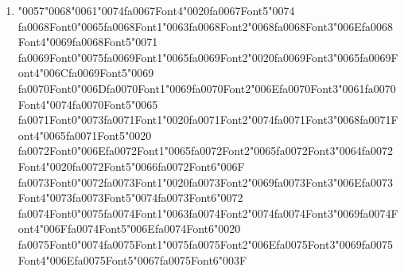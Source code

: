 \documentclass[12pt]{article}
\begin{document}
\begin{enumerate}[label=Q\arabic*.]
\begin{enumerate}[label=(\Alph*)]
    \item DPO trains directly on preference pairs without a separate reward model
    \item DPO requires a value network to compute advantages
    \item DPO prohibits using preference data
    \item DPO only optimizes next-word likelihood
\end{enumerate}
\item {\char"0057}{\char"0068}{\char"0061}{\char"0074}{\csname fa0067Font4\endcsname\char"0020}{\csname fa0067Font5\endcsname\char"0074} {\csname fa0068Font0\endcsname\char"0065}{\csname fa0068Font1\endcsname\char"0063}{\csname fa0068Font2\endcsname\char"0068}{\csname fa0068Font3\endcsname\char"006E}{\csname fa0068Font4\endcsname\char"0069}{\csname fa0068Font5\endcsname\char"0071} {\csname fa0069Font0\endcsname\char"0075}{\csname fa0069Font1\endcsname\char"0065}{\csname fa0069Font2\endcsname\char"0020}{\csname fa0069Font3\endcsname\char"0065}{\csname fa0069Font4\endcsname\char"006C}{\csname fa0069Font5\endcsname\char"0069} {\csname fa0070Font0\endcsname\char"006D}{\csname fa0070Font1\endcsname\char"0069}{\csname fa0070Font2\endcsname\char"006E}{\csname fa0070Font3\endcsname\char"0061}{\csname fa0070Font4\endcsname\char"0074}{\csname fa0070Font5\endcsname\char"0065} {\csname fa0071Font0\endcsname\char"0073}{\csname fa0071Font1\endcsname\char"0020}{\csname fa0071Font2\endcsname\char"0074}{\csname fa0071Font3\endcsname\char"0068}{\csname fa0071Font4\endcsname\char"0065}{\csname fa0071Font5\endcsname\char"0020} {\csname fa0072Font0\endcsname\char"006E}{\csname fa0072Font1\endcsname\char"0065}{\csname fa0072Font2\endcsname\char"0065}{\csname fa0072Font3\endcsname\char"0064}{\csname fa0072Font4\endcsname\char"0020}{\csname fa0072Font5\endcsname\char"0066}{\csname fa0072Font6\endcsname\char"006F} {\csname fa0073Font0\endcsname\char"0072}{\csname fa0073Font1\endcsname\char"0020}{\csname fa0073Font2\endcsname\char"0069}{\csname fa0073Font3\endcsname\char"006E}{\csname fa0073Font4\endcsname\char"0073}{\csname fa0073Font5\endcsname\char"0074}{\csname fa0073Font6\endcsname\char"0072} {\csname fa0074Font0\endcsname\char"0075}{\csname fa0074Font1\endcsname\char"0063}{\csname fa0074Font2\endcsname\char"0074}{\csname fa0074Font3\endcsname\char"0069}{\csname fa0074Font4\endcsname\char"006F}{\csname fa0074Font5\endcsname\char"006E}{\csname fa0074Font6\endcsname\char"0020} {\csname fa0075Font0\endcsname\char"0074}{\csname fa0075Font1\endcsname\char"0075}{\csname fa0075Font2\endcsname\char"006E}{\csname fa0075Font3\endcsname\char"0069}{\csname fa0075Font4\endcsname\char"006E}{\csname fa0075Font5\endcsname\char"0067}{\csname fa0075Font6\endcsname\char"003F}

\end{enumerate}
\end{document}
